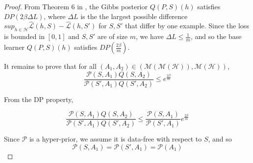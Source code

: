 \documentclass{article}
\theoremstyle{definition}
\begin{document}
\begin{proof}
	From Theorem 6 in \citet{McSherry2007}, the Gibbs posterior $Q(P, S)(h)$ satisfies $DP\left (2\beta\Delta L\right )$, where $\Delta L$ is the the largest possible difference  $sup_{h\in\mathcal{H}}\hat{\mathcal{L}}(h,S)-\hat{\mathcal{L}}(h,S')$ for $S,S'$ that differ by one example. Since the loss is bounded in $[0,1]$ and $S,S'$ are of size $m$, we have $\Delta L\leq \frac{1}{m}$, and so the base learner $Q(P, S)(h)$ satisfies $DP\left (\frac{2\beta}{m}\right )$.
	
	
	It remains to prove that for all $(A_1,A_2)\in (\mathcal{M}(\mathcal{M}(\mathcal{H})), \mathcal{M}(\mathcal{H}))$, 
	$$ \frac{\mathcal{P}(S, A_1)Q(S,A_2)}{\mathcal{P}(S', A_1)Q(S',A_2)}\leq e^{\frac{2\beta}{m}}$$
	
	From the DP property, 
	
	$$ \frac{\mathcal{P}(S, A_1)Q(S,A_2)}{\mathcal{P}(S', A_1)Q(S',A_2)}\leq \frac{\mathcal{P}(S, A_1)}{\mathcal{P}(S', A_1)}e^{\frac{2\beta}{m}}$$
	
	Since $\mathcal{P}$ is a hyper-prior, we assume it is data-free with respect to $S$, and so 
	$$\mathcal{P}(S, A_1)=\mathcal{P}(S', A_1)=\mathcal{P}(A_1)$$
	
\end{proof}
\end{document}
